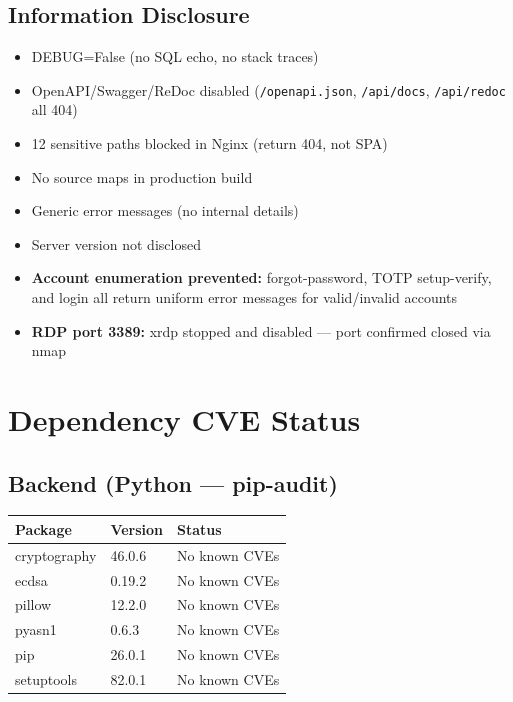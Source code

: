 \documentclass[11pt,a4paper]{article}
\begin{document}
\subsection{Information Disclosure}

\begin{tcolorbox}[colback=pass!5, colframe=pass, title=\textbf{Information Leakage --- PASS}]
\begin{itemize}[nosep]
  \item DEBUG=False (no SQL echo, no stack traces)
  \item OpenAPI/Swagger/ReDoc disabled (\texttt{/openapi.json}, \texttt{/api/docs}, \texttt{/api/redoc} all 404)
  \item 12 sensitive paths blocked in Nginx (return 404, not SPA)
  \item No source maps in production build
  \item Generic error messages (no internal details)
  \item Server version not disclosed
  \item \textbf{Account enumeration prevented:} forgot-password, TOTP setup-verify, and login all return uniform error messages for valid/invalid accounts
  \item \textbf{RDP port 3389:} xrdp stopped and disabled --- port confirmed closed via nmap
\end{itemize}
\end{tcolorbox}

\newpage
\section{Dependency CVE Status}

\subsection{Backend (Python --- pip-audit)}

\begin{center}
\begin{tabularx}{\textwidth}{llX}
\toprule
\textbf{Package} & \textbf{Version} & \textbf{Status} \\
\midrule
cryptography & 46.0.6 & \textcolor{pass}{No known CVEs} \\
ecdsa & 0.19.2 & \textcolor{pass}{No known CVEs} \\
pillow & 12.2.0 & \textcolor{pass}{No known CVEs} \\
pyasn1 & 0.6.3 & \textcolor{pass}{No known CVEs} \\
pip & 26.0.1 & \textcolor{pass}{No known CVEs} \\
setuptools & 82.0.1 & \textcolor{pass}{No known CVEs} \\
\bottomrule
\end{tabularx}
\end{center}
\end{document}
